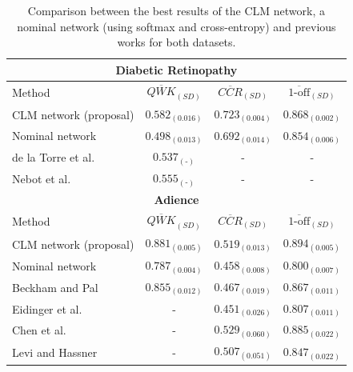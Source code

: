 \documentclass[journal]{IEEEtran}
\begin{document}
	\begin{table}[!t]
		\caption{Comparison between the best results of the CLM network, a nominal network (using softmax and cross-entropy) and previous works for both datasets.}
		\label{table:Comparison}
		\scriptsize
		\centering
		\def\arraystretch{1.3}
		\begin{tabular}{lccc}
			\hline\hline
			\multicolumn{4}{c}{\textbf{Diabetic Retinopathy}}\\
			\hline
			Method                                    & $\overline{QWK}_{(SD)}$ & $\overline{CCR}_{(SD)}$ & $\overline{\text{1-off}}_{(SD)}$ \\ \hline
			CLM network (proposal)                          &    $0.582_{(0.016)}$    &    $0.723_{(0.004)}$    &        $0.868_{(0.002)}$         \\
			Nominal network                           &    $0.498_{(0.013)}$    &    $0.692_{(0.014)}$    &        $0.854_{(0.006)}$         \\
			de la Torre et al. \cite{de2018weighted}     &  $0.537_{(\text{-})}$   &            -            &                -                 \\
			Nebot et al. \cite{nebot2016diabetic}  &  $0.555_{(\text{-})}$   &            -            &                -                 \\
			\hline
			\multicolumn{4}{c}{\textbf{Adience}}\\
			\hline
			Method                                    & $\overline{QWK}_{(SD)}$ & $\overline{CCR}_{(SD)}$ & $\overline{\text{1-off}}_{(SD)}$ \\ \hline
			CLM network (proposal)                          &    $0.881_{(0.005)}$    &    $0.519_{(0.013)}$    &        $0.894_{(0.005)}$         \\
			Nominal network                           &    $0.787_{(0.004)}$    &    $0.458_{(0.008)}$    &        $0.800_{(0.007)}$         \\
			Beckham and Pal \cite{beckham2017unimodal} &    $0.855_{(0.012)}$    &    $0.467_{(0.019)}$    &        $0.867_{(0.011)}$         \\
			Eidinger et al. \cite{eidinger2014age} &            -            &    $0.451_{(0.026)}$    &        $0.807_{(0.011)}$         \\
			Chen et al. \cite{chen2016cascaded} &            -            &    $0.529_{(0.060)}$    &        $0.885_{(0.022)}$         \\
			Levi and Hassner \cite{levi2015age}         &            -            &    $0.507_{(0.051)}$    &        $0.847_{(0.022)}$         \\ \hline\hline
		\end{tabular}
	\end{table}
	
\end{document}
